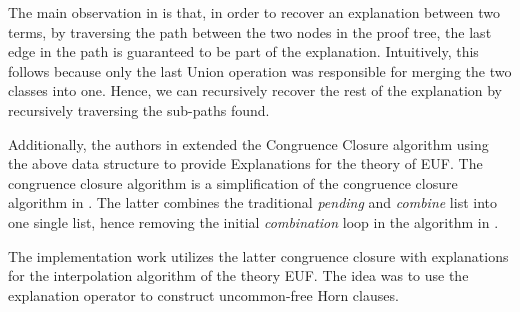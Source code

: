 The main observation in \cite{10.1007/978-3-540-32033-3_33} 
is that, in order to recover an explanation between 
two terms, by traversing the path between the two nodes 
in the proof tree, the last edge in the path is guaranteed to 
be part of the explanation. Intuitively, this follows 
because only 
the last Union operation was responsible for merging the 
two classes into one. Hence, we can recursively recover 
the rest of the explanation by recursively traversing 
the sub-paths found.

Additionally, the authors in 
\cite{10.1007/978-3-540-32033-3_33} 
extended the Congruence Closure algorithm 
\cite{10.1007/978-3-540-39813-4_5} using the above data 
structure to provide Explanations for the theory of EUF.  
The congruence closure algorithm is a 
simplification of the congruence 
closure algorithm in \cite{10.1145/322217.322228}. The latter 
combines the traditional \emph{pending} and \emph{combine} list 
into one single list, hence removing the initial 
\emph{combination} loop in the algorithm in 
\cite{10.1145/322217.322228}.

The implementation work utilizes the latter congruence closure
with explanations for the interpolation algorithm of the 
theory EUF. The idea was to use the explanation operator
to construct uncommon-free Horn clauses.

